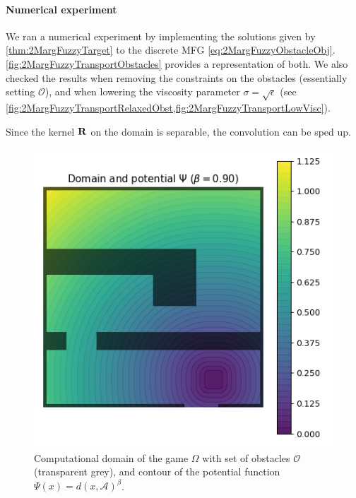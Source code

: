 \documentclass[../report.tex]{subfiles}
\begin{document}
\paragraph{Numerical experiment} We ran a numerical experiment by implementing the solutions given by \cref{thm:2MargFuzzyTarget} to the discrete MFG \eqref{eq:2MargFuzzyObstacleObj}. \cref{fig:2MargFuzzyTransportObstacles} provides a representation of both. We also checked the results when removing the constraints on the obstacles (essentially setting $\mathscr{O}$), and when lowering the viscosity parameter $\sigma = \sqrt{\epsilon}$ (see \cref{fig:2MargFuzzyTransportRelaxedObst,fig:2MargFuzzyTransportLowVisc}).

Since the kernel $\mathbf{R}$ on the domain is separable, the convolution can be sped up.


\begin{figure}
	\centering
	\includegraphics[width=0.5\linewidth]{../project/images/crowd_potential.png}
	\caption{Computational domain of the game $\Omega$ with set of obstacles $\mathscr{O}$ (transparent grey), and contour of the potential function $\Psi(x) = d(x, \mathscr A)^\beta$.} \label{fig:CrowdExamplePotential}	
\end{figure}
\end{document}
